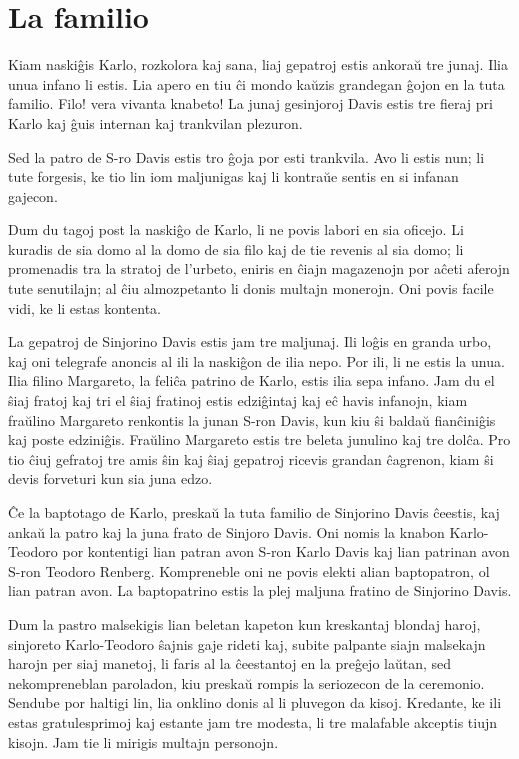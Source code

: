 \chapter{La familio}

Kiam naskiĝis Karlo, rozkolora kaj sana, liaj gepatroj estis ankoraŭ tre junaj. Ilia unua infano li estis. Lia apero en tiu ĉi mondo kaŭzis grandegan ĝojon en la tuta familio. Filo! vera vivanta knabeto! La junaj gesinjoroj Davis estis tre fieraj pri Karlo kaj ĝuis internan kaj trankvilan plezuron.

Sed la patro de S-ro Davis estis tro ĝoja por esti trankvila. Avo li estis nun; li tute forgesis, ke tio lin iom maljunigas kaj li kontraŭe sentis en si infanan gajecon.

Dum du tagoj post la naskiĝo de Karlo, li ne povis labori en sia oficejo. Li kuradis de sia domo al la domo de sia filo kaj de tie revenis al sia domo; li promenadis tra la stratoj de l'urbeto, eniris en ĉiajn magazenojn por aĉeti aferojn tute senutilajn; al ĉiu almozpetanto li donis multajn monerojn. Oni povis facile vidi, ke li estas kontenta.

La gepatroj de Sinjorino Davis estis jam tre maljunaj. Ili loĝis en granda urbo, kaj oni telegrafe anoncis al ili la naskiĝon de ilia nepo. Por ili, li ne estis la unua. Ilia filino Margareto, la feliĉa patrino de Karlo, estis ilia sepa infano. Jam du el ŝiaj fratoj kaj tri el ŝiaj fratinoj estis edziĝintaj kaj eĉ havis infanojn, kiam fraŭlino Margareto renkontis la junan S-ron Davis, kun kiu ŝi baldaŭ fianĉiniĝis kaj poste edziniĝis. Fraŭlino Margareto estis tre beleta junulino kaj tre dolĉa. Pro tio ĉiuj gefratoj tre amis ŝin kaj ŝiaj gepatroj ricevis grandan ĉagrenon, kiam ŝi devis forveturi kun sia juna edzo.

Ĉe la baptotago de Karlo, preskaŭ la tuta familio de Sinjorino Davis ĉeestis, kaj ankaŭ la patro kaj la juna frato de Sinjoro Davis. Oni nomis la knabon Karlo-Teodoro por kontentigi lian patran avon S-ron Karlo Davis kaj lian patrinan avon S-ron Teodoro Renberg. Kompreneble oni ne povis elekti alian baptopatron, ol lian patran avon. La baptopatrino estis la plej maljuna fratino de Sinjorino Davis.

Dum la pastro malsekigis lian beletan kapeton kun kreskantaj blondaj haroj, sinjoreto Karlo-Teodoro ŝajnis gaje rideti kaj, subite palpante siajn malsekajn harojn per siaj manetoj, li faris al la ĉeestantoj en la preĝejo laŭtan, sed nekompreneblan paroladon, kiu preskaŭ rompis la seriozecon de la ceremonio. Sendube por haltigi lin, lia onklino donis al li pluvegon da kisoj. Kredante, ke ili estas gratulesprimoj kaj estante jam tre modesta, li tre malafable akceptis tiujn kisojn. Jam tie li mirigis multajn personojn.

